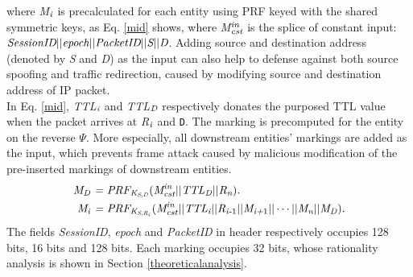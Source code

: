 where \emph{M}$_{\emph{i}}$ is precalculated for each entity using PRF keyed with the shared symmetric keys, as Eq. \ref{mid} shows, where \emph{M}$_{\emph{cst}}^{\emph{in}}$ is the splice of constant input: $\emph{SessionID} \vert \vert \emph{epoch} \vert \vert \emph{PacketID} \vert \vert \emph{S} \vert \vert \emph{D}$. Adding source and destination address (denoted by \emph{S} and \emph{D}) as the input can also help to defense against both source spoofing and traffic redirection, caused by modifying source and destination address of IP packet.\\
\indent In Eq. \ref{mid}, \emph{TTL}$_\emph{i}$ and \emph{TTL}$_\emph{D}$ respectively donates the purposed TTL value when the packet arrives at \emph{R}$_\emph{i}$ and {\tt D}. %
The marking is precomputed for the entity on the reverse $\Psi$. More especially, all downstream entities' markings are added as the input, which prevents frame attack caused by malicious modification of the pre-inserted markings of downstream entities.
\vspace{-0.06in}
\begin{equation}\label{mid}
    \begin{split}
    \emph{M}_\emph{D} &~\emph{=} ~\emph{PRF}_{\emph{K}_{\emph{S,D}}}(\emph{M}_{\emph{cst}}^{\emph{in}} \vert \vert \emph{TTL}_\emph{D} \vert \vert \emph{R}_\emph{n}).\\
    \emph{M}_\emph{i} &~\emph{=} ~\emph{PRF}_{\emph{K}_{\emph{S,R$_\emph{\emph{i}}$}}}(\emph{M}_{\emph{cst}}^{\emph{in}} \vert \vert \emph{TTL}_\emph{i} \vert \vert \emph{R}_{\emph{i-}1} \vert \vert \emph{M}_{\emph{i+}1} \vert \vert \cdots \vert \vert \emph{M}_\emph{n} \vert \vert \emph{M}_\emph{D} ).\\
    \end{split}
\vspace{-0.06in}
\end{equation}
\indent The fields \emph{SessionID}, \emph{epoch} and \emph{PacketID} in \name{} header respectively occupies 128 bits, 16 bits and 128 bits. Each marking occupies 32 bits, whose rationality analysis is shown in Section \ref{theoreticalanalysis}.
\vspace{-0.1in}
